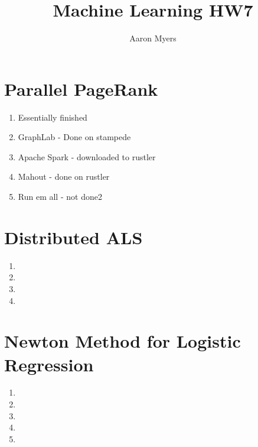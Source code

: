 \documentclass[a4paper,10pt]{article}
\title{Machine Learning HW7}
\author{Aaron Myers}
\begin{document}
\maketitle
\section{Parallel PageRank}
\begin{enumerate}
	\item Essentially finished
	\item GraphLab - Done on stampede
	\item Apache Spark - downloaded to rustler
	\item Mahout - done on rustler
	\item Run em all - not done2
\end{enumerate}

\section{Distributed ALS}
\begin{enumerate}
	\item
	\item
	\item
	\item
\end{enumerate}
\section{Newton Method for Logistic Regression}

\begin{enumerate}
	\item
	\item
	\item
	\item
	\item
\end{enumerate}
\end{document}
